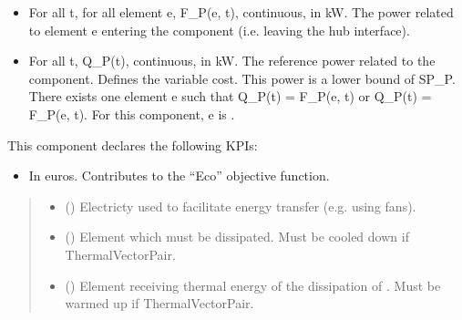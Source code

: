\documentclass[letterpaper,10pt,english]{sphinxmanual}
\begin{document}
\begin{fulllineitems}
\begin{fulllineitems}
\begin{itemize}
\item {} 
\sphinxAtStartPar
For all t, for all element e, F\_P(e, t), continuous, in kW.
The power related to element e entering the component (i.e. leaving the hub interface).

\item {} 
\sphinxAtStartPar
For all t, Q\_P(t), continuous, in kW.
The reference power related to the component. Defines the variable cost.
This power is a lower bound of SP\_P.
There exists one element e such that Q\_P(t) = F\_P(e, t) or Q\_P(t) = \sphinxhyphen{} F\_P(e, t).
For this component, e is .

\end{itemize}

\sphinxAtStartPar
This component declares the following KPIs:
\begin{itemize}
\item {} 
\sphinxAtStartPar
{}
In euros.
Contributes to the “Eco” objective function.

\end{itemize}
\begin{quote}\begin{description}
\begin{itemize}
\item {} 
\sphinxAtStartPar
{} ({\hyperref[\detokenize{generated/tamos.element.ElectricityVector:tamos.element.ElectricityVector}]{}}) \textendash{} Electricty used to facilitate energy transfer (e.g. using fans).

\item {} 
\sphinxAtStartPar
{} () \textendash{} Element which must be dissipated.
Must be cooled down if ThermalVectorPair.

\item {} 
\sphinxAtStartPar
{} () \textendash{} Element receiving thermal energy of the dissipation of .
Must be warmed up if ThermalVectorPair.


\end{itemize}
\end{description}
\end{quote}
\end{fulllineitems}
\end{fulllineitems}
\end{document}

